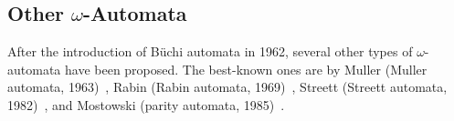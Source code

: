 \documentclass[a4paper]{report}
\newcommand{\om}{{$\omega$}}
\begin{document}







\subsection{Other \om-Automata}
After the introduction of Büchi automata in 1962, several other types of \om-automata have been proposed. The best-known ones are by Muller (Muller automata, 1963)~\cite{1963_muller}, Rabin (Rabin automata, 1969)~\cite{rabin1969decidability}, Streett (Streett automata, 1982)~\cite{Streett1982121}, and Mostowski (parity automata, 1985)~\cite{1985_mostowski}.
\end{document}
